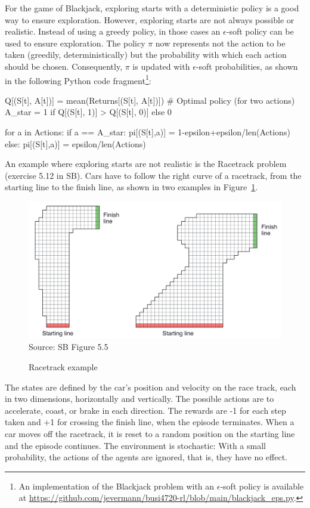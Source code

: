 For the game of Blackjack, exploring starts with a deterministic policy is a good way to ensure exploration. However, exploring starts are not always possible or realistic. Instead of using a greedy policy, in those cases an $\epsilon$-soft policy can be used to ensure exploration. The policy $\pi$ now represents not the action to be taken (greedily, deterministically) but the probability with which each action should be chosen. Consequently, $\pi$ is updated with $\epsilon$-soft probabilities, as shown in the following Python code fragment\footnote{An implementation of the Blackjack problem with an $\epsilon$-soft policy is available at \url{https://github.com/jevermann/busi4720-rl/blob/main/blackjack_eps.py}.}:

\begin{pythoncode}
Q[(S[t], A[t])] = mean(Returns[(S[t], A[t])])
# Optimal policy (for two actions)
A_star = 1 if Q[(S[t], 1)] > Q[(S[t], 0)] else 0

for a in Actions:
    if a == A_star:
        pi[(S[t],a)] = 1-epsilon+epsilon/len(Actions)
    else:
        pi[(S[t],a)] = epsilon/len(Actions)
\end{pythoncode}

An example where exploring starts are not realistic is the Racetrack problem (exercise 5.12 in SB). Cars have to follow the right curve of a racetrack, from the starting line to the finish line, as shown in two examples in Figure~\ref{fig:racetrack}.

\begin{figure}
\centering
\includegraphics[width=.75\textwidth]{screen5.png} \\
\scriptsize Source: SB Figure 5.5 \normalsize
\caption{Racetrack example}
\label{fig:racetrack}
\end{figure}

The states are defined by the car's position and velocity on the race track, each in two dimensions, horizontally and vertically. The possible actions are to accelerate, coast, or brake in each direction. The rewards are -1 for each step taken and +1 for crossing the finish line, when the episode terminates. When a car moves off the racetrack, it is reset to a random position on the starting line and the episode continues. The environment is stochastic: With a small probability, the actions of the agents are ignored, that is, they have no effect.

